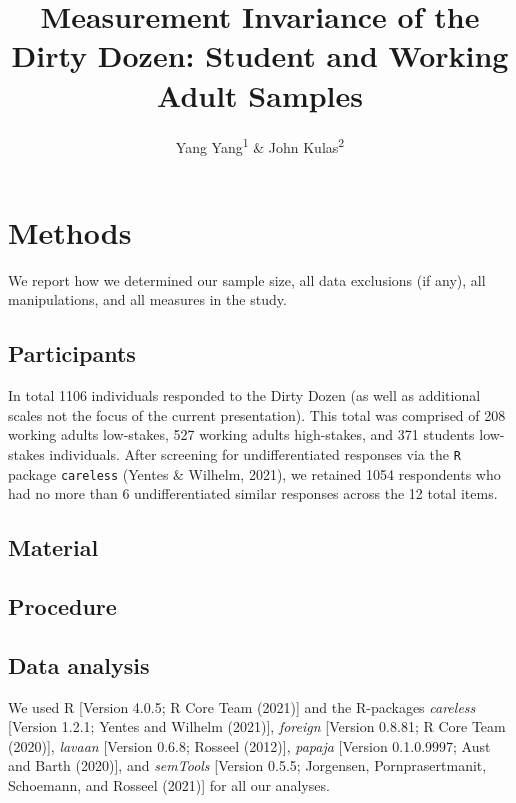 \documentclass[
  english,
  man]{apa6}
\title{Measurement Invariance of the Dirty Dozen: Student and Working Adult Samples}
\author{Yang Yang\textsuperscript{1} \& John Kulas\textsuperscript{2}}
\date{}
\affiliation{\vspace{0.5cm}\textsuperscript{1} Roche\\\textsuperscript{2} Montclair State University}
\begin{document}
\maketitle

\hypertarget{methods}{%
\section{Methods}\label{methods}}

We report how we determined our sample size, all data exclusions (if any), all manipulations, and all measures in the study.

\hypertarget{participants}{%
\subsection{Participants}\label{participants}}

In total 1106 individuals responded to the Dirty Dozen (as well as additional scales not the focus of the current presentation). This total was comprised of 208 working adults low-stakes, 527 working adults high-stakes, and 371 students low-stakes individuals. After screening for undifferentiated responses via the \texttt{R} package \texttt{careless} (Yentes \& Wilhelm, 2021), we retained 1054 respondents who had no more than 6 undifferentiated similar responses across the 12 total items.

\hypertarget{material}{%
\subsection{Material}\label{material}}

\hypertarget{procedure}{%
\subsection{Procedure}\label{procedure}}

\hypertarget{data-analysis}{%
\subsection{Data analysis}\label{data-analysis}}

We used R {[}Version 4.0.5; R Core Team (2021){]} and the R-packages \emph{careless} {[}Version 1.2.1; Yentes and Wilhelm (2021){]}, \emph{foreign} {[}Version 0.8.81; R Core Team (2020){]}, \emph{lavaan} {[}Version 0.6.8; Rosseel (2012){]}, \emph{papaja} {[}Version 0.1.0.9997; Aust and Barth (2020){]}, and \emph{semTools} {[}Version 0.5.5; Jorgensen, Pornprasertmanit, Schoemann, and Rosseel (2021){]} for all our analyses.
\end{document}

